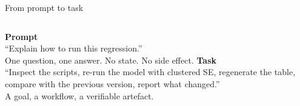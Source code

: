 \begin{frame}{From prompt to task}
  \begin{columns}[T,onlytextwidth]
      \textbf{Prompt}\\[0.2cm]
      ``Explain how to run this regression.''
      \vspace{0.4cm}\\
      \scriptsize\color{muted}One question, one answer. No state. No side effect.
      \textbf{Task}\\[0.2cm]
      ``Inspect the scripts, re-run the model with clustered SE, regenerate the table, compare with the previous version, report what changed.''
      \vspace{0.4cm}\\
      \scriptsize\color{muted}A goal, a workflow, a verifiable artefact.
  \end{columns}
  \vspace{0.5cm}
\end{frame}

